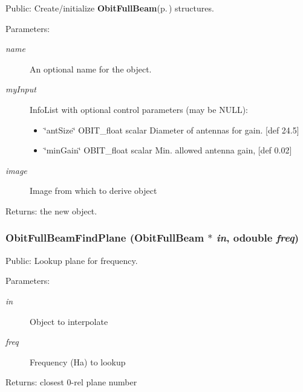 Public: Create/initialize {\bf Obit\-Full\-Beam}{\rm (p.\,\pageref{structObitFullBeam})} structures. 

\begin{Desc}
\item[Parameters:]
\begin{description}
\item[{\em name}]An optional name for the object. \item[{\em my\-Input}]Info\-List with optional control parameters (may be NULL): \begin{itemize}
\item \char`\"{}ant\-Size\char`\"{} OBIT\_\-float scalar Diameter of antennas for gain. [def 24.5] \item \char`\"{}min\-Gain\char`\"{} OBIT\_\-float scalar Min. allowed antenna gain, [def 0.02] \end{itemize}
\item[{\em image}]Image from which to derive object \end{description}
\end{Desc}
\begin{Desc}
\item[Returns:]the new object. \end{Desc}
\subsubsection{ Obit\-Full\-Beam\-Find\-Plane ({\bf Obit\-Full\-Beam} $\ast$ {\em in}, {\bf odouble} {\em freq})}\label{ObitFullBeam_8c_a14}


Public: Lookup plane for frequency. 

\begin{Desc}
\item[Parameters:]
\begin{description}
\item[{\em in}]Object to interpolate \item[{\em freq}]Frequency (Ha) to lookup \end{description}
\end{Desc}
\begin{Desc}
\item[Returns:]closest 0-rel plane number \end{Desc}
